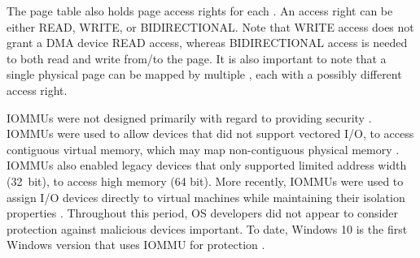 The page table also holds page access rights for each \iova. An access right can be either READ, WRITE, or BIDIRECTIONAL. Note that WRITE access does not grant a DMA device READ access, whereas BIDIRECTIONAL access is needed to both read and write from/to the page. It is also important to note that a single physical page can be mapped by multiple \iova, each with a possibly different access right.

IOMMUs were not designed primarily with regard to providing security \cite{DWT79}. IOMMUs were used to allow devices that did not support vectored I/O, to access contiguous virtual memory, which may map non-contiguous physical memory \cite{Chu96, WMM97}. IOMMUs also enabled legacy devices that only supported limited address width (32~bit), to access high memory (64 bit). More recently, IOMMUs were used to assign I/O devices directly to virtual machines while maintaining their isolation properties \cite{Int16b, AMD16}. Throughout this period, OS developers did not appear to consider protection against malicious devices important. To date, Windows 10 is the first Windows version that uses IOMMU for protection \cite{Mic17}.



